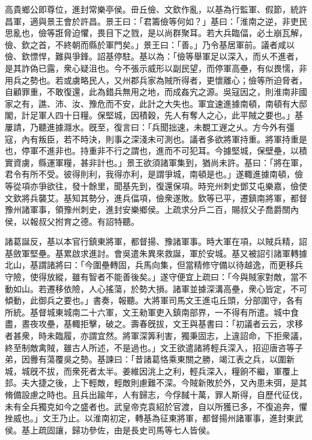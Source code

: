 \begin{pinyinscope}
高貴鄉公即尊位，進封常樂亭侯。毌丘儉、文欽作亂，以基為行監軍、假節，統許昌軍，適與景王會於許昌。景王曰：「君籌儉等何如？」基曰：「淮南之逆，非吏民思亂也，儉等誑脅迫懼，畏目下之戮，是以尚群聚耳。若大兵臨偪，必土崩瓦解，儉、欽之首，不終朝而縣於軍門矣。」景王曰：「善。」乃令基居軍前。議者咸以儉、欽慓悍，難與爭鋒。詔基停駐。基以為：「儉等舉軍足以深入，而乆不進者，是其詐偽已露，衆心疑沮也。今不張示威形以副民望，而停軍高壘，有似畏懦，非用兵之勢也。若或虜略民人，又州郡兵家為賊所得者，更懷離心；儉等所迫脅者，自顧罪重，不敢復還，此為錯兵無用之地，而成姦宄之源。吳寇因之，則淮南非國家之有，譙、沛、汝、豫危而不安，此計之大失也。軍宜速進據南頓，南頓有大邸閣，計足軍人四十日糧。保堅城，因積穀，先人有奪人之心，此平賊之要也。」基屢請，乃聽進據㶏水。旣至，復言曰：「兵聞拙速，未覩工遟之乆。方今外有彊寇，內有叛臣，若不時決，則事之深淺未可測也。議者多欲將軍持重。將軍持重是也，停軍不進非也。持重非不行之謂也，進而不可犯耳。今據堅城，保壁壘，以積實資虜，縣運軍糧，甚非計也。」景王欲須諸軍集到，猶尚未許。基曰：「將在軍，君令有所不受。彼得則利，我得亦利，是謂爭城，南頓是也。」遂輙進據南頓，儉等從項亦爭欲往，發十餘里，聞基先到，復還保項。時兖州刺史鄧艾屯樂嘉，儉使文欽將兵襲艾。基知其勢分，進兵偪項，儉衆遂敗。欽等已平，遷鎮南將軍，都督豫州諸軍事，領豫州刺史，進封安樂鄉侯。上疏求分戶二百，賜叔父子喬爵關內侯，以報叔父拊育之德。有詔特聽。

諸葛誕反，基以本官行鎮東將軍，都督揚、豫諸軍事。時大軍在項，以賊兵精，詔基斂軍堅壘。基累啟求進討。會吳遣朱異來救誕，軍於安城。基又被詔引諸軍轉據北山，基謂諸將曰：「今圍壘轉固，兵馬向集，但當精修守備以待越逸，而更移兵守險，使得放縱，雖有智者不能善後矣。」遂守便宜上疏曰：「今與賊家對敵，當不動如山。若遷移依險，人心搖蕩，於勢大損。諸軍並據深溝高壘，衆心皆定，不可傾動，此御兵之要也。」書奏，報聽。大將軍司馬文王進屯丘頭，分部圍守，各有所統。基督城東城南二十六軍，文王勑軍吏入鎮南部界，一不得有所遣。城中食盡，晝夜攻壘，基輙拒擊，破之。壽春旣拔，文王與基書曰：「初議者云云，求移者甚衆，時未臨履，亦謂宜然。將軍深筭利害，獨秉固志，上違詔命，下拒衆議，終至制敵禽賊，雖古人所述，不是過也。」文王欲遣諸將輕兵深入，招迎唐咨等子弟，因釁有蕩覆吳之勢。基諫曰：「昔諸葛恪乘東關之勝，竭江表之兵，以圍新城，城旣不拔，而衆死者太半。姜維因洮上之利，輕兵深入，糧餉不繼，軍覆上邽。夫大捷之後，上下輕敵，輕敵則慮難不深。今賊新敗於外，又內患未弭，是其脩備設慮之時也。且兵出踰年，人有歸志，今俘馘十萬，罪人斯得，自歷代征伐，未有全兵獨克如今之盛者也。武皇帝克袁紹於官渡，自以所獲已多，不復追奔，懼挫威也。」文王乃止。以淮南初定，轉基為征東將軍，都督揚州諸軍事，進封東武侯。基上疏固讓，歸功參佐，由是長史司馬等七人皆侯。


\end{pinyinscope}

